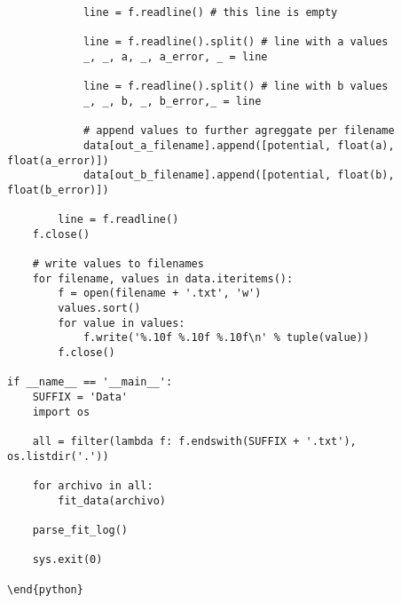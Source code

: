 \documentclass[a4paper]{article}
\begin{document}
\begin{verbatim}
            line = f.readline() # this line is empty

            line = f.readline().split() # line with a values
            _, _, a, _, a_error, _ = line

            line = f.readline().split() # line with b values
            _, _, b, _, b_error,_ = line

            # append values to further agreggate per filename
            data[out_a_filename].append([potential, float(a), float(a_error)])
            data[out_b_filename].append([potential, float(b), float(b_error)])

        line = f.readline()
    f.close()

    # write values to filenames
    for filename, values in data.iteritems():
        f = open(filename + '.txt', 'w')
        values.sort()
        for value in values:
            f.write('%.10f %.10f %.10f\n' % tuple(value))
        f.close()

if __name__ == '__main__':
    SUFFIX = 'Data'
    import os

    all = filter(lambda f: f.endswith(SUFFIX + '.txt'), os.listdir('.'))

    for archivo in all:
        fit_data(archivo)

    parse_fit_log()

    sys.exit(0)

\end{python}
\end{verbatim}
\end{document}

